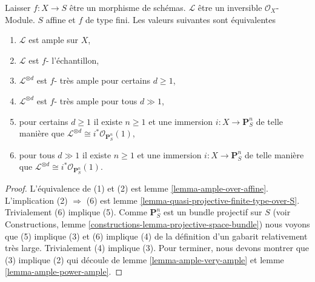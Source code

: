 \begin{lemma}

\label{lemma-finite-type-over-affine-ample-very-ample}

Laisser $f : X \to S$ être un morphisme de schémas. $\mathcal{L}$ être un inversible $\mathcal{O}_X$- Module. $S$ affine et $f$ de type fini. Les valeurs suivantes sont équivalentes

\begin{enumerate}

\item  $\mathcal{L}$ est ample sur $X$,
\item  $\mathcal{L}$ est $f$- l'échantillon,
\item  $\mathcal{L}^{\otimes d}$ est $f$- très ample pour certains $d \geq 1$,
\item  $\mathcal{L}^{\otimes d}$ est $f$- très ample pour tous $d \gg 1$,
\item pour certains $d \geq 1$ il existe $n \geq 1$ et une immersion
$i : X \to \mathbf{P}^n_S$ de telle manière que
$\mathcal{L}^{\otimes d} \cong i^*\mathcal{O}_{\mathbf{P}^n_S}(1)$,
\item pour tous $d \gg 1$ il existe $n \geq 1$ et une immersion
$i : X \to \mathbf{P}^n_S$ de telle manière que
$\mathcal{L}^{\otimes d} \cong i^*\mathcal{O}_{\mathbf{P}^n_S}(1)$.

\end{enumerate}

\end{lemma}

\begin{proof}
L'équivalence de (1) et (2) est lemme \ref{lemma-ample-over-affine}. L'implication (2) $\Rightarrow$ (6) est lemme \ref{lemma-quasi-projective-finite-type-over-S}. Trivialement (6) implique (5). Comme $\mathbf{P}^n_S$ est un bundle projectif sur $S$ (voir Constructions, lemme \ref{constructions-lemma-projective-space-bundle}) nous voyons que (5) implique (3) et (6) implique (4) de la définition d'un gabarit relativement très large. Trivialement (4) implique (3). Pour terminer, nous devons montrer que (3) implique (2) qui découle de lemme \ref{lemma-ample-very-ample} et lemme \ref{lemma-ample-power-ample}.
\end{proof}

